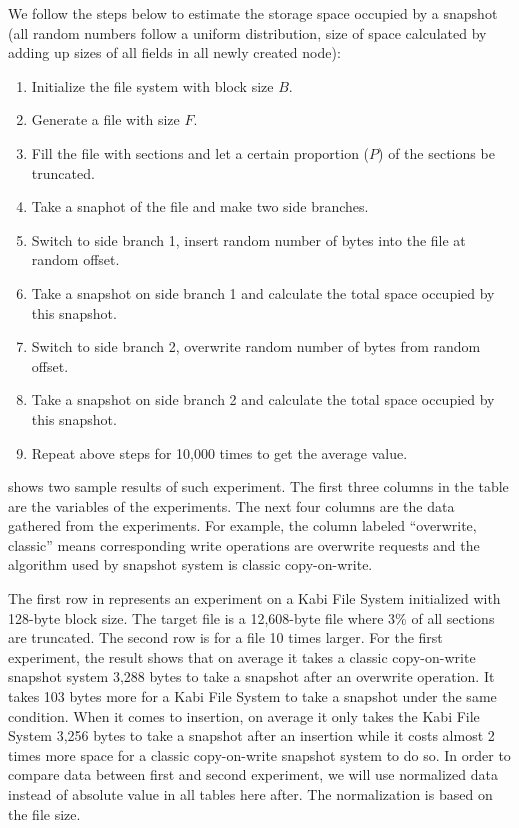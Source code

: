     We follow the steps below to estimate the storage space occupied by a snapshot (all random numbers follow a uniform distribution, size of space calculated by adding up sizes of all fields in all newly created node):

\begin{enumerate}

	\item Initialize the file system with block size $B$.

	\item Generate a file with size $F$.

	\item Fill the file with sections and let a certain proportion ($P$) of the sections be truncated.

	\item Take a snaphot of the file and make two side branches.
	
	\item Switch to side branch 1, insert random number of bytes into the file at random offset.

	\item Take a snapshot on side branch 1 and calculate the total space occupied by this snapshot.

	\item Switch to side branch 2, overwrite random number of bytes from random offset.

	\item Take a snapshot on side branch 2 and calculate the total space occupied by this snapshot.

	\item Repeat above steps for 10,000 times to get the average value.

\end{enumerate}

     shows two sample results of such experiment. The first three columns in the table are the variables of the experiments. The next four columns are the data gathered from the experiments. For example, the column labeled ``overwrite, classic'' means corresponding write operations are overwrite requests and the algorithm used by snapshot system is classic copy-on-write.

    The first row in  represents an experiment on a Kabi File System initialized with 128-byte block size. The target file is a 12,608-byte file where 3\% of all sections are truncated. The second row is for a file 10 times larger. For the first experiment, the result shows that on average it takes a classic copy-on-write snapshot system 3,288 bytes to take a snapshot after an overwrite operation. It takes 103 bytes more for a Kabi File System to take a snapshot under the same condition. When it comes to insertion, on average it only takes the Kabi File System 3,256 bytes to take a snapshot after an insertion while it costs almost 2 times more space for a classic copy-on-write snapshot system to do so. In order to compare data between first and second experiment, we will use normalized data instead of absolute value in all tables here after. The normalization is based on the file size.

